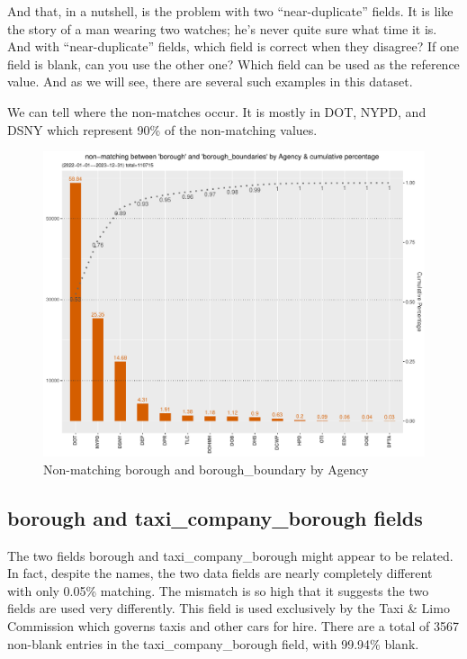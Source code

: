 \documentclass[12pt, titlepage]{article}
\begin{document}
{And that, in a nutshell, is the problem with two ``near-duplicate'' 
fields. It is like the  story of a man wearing two watches; he's never 
quite sure what time it is. And with ``near-duplicate'' fields, which 
field is correct when they disagree? If one field is blank, can you 
use the other one? Which field can be used as the reference value. And 
as we will see, there are several such examples in this dataset.

We can tell where the non-matches occur. It is mostly in DOT, NYPD, 
and DSNY which represent 90\% of the non-matching values.

	\begin{figure}[tbp]
		\centering
		\includegraphics[width = \textwidth]{non_matching_borough_boundaries_chart.pdf}
		\caption{Non-matching borough and borough\_boundary by Agency}
		\label{fig:borough-boundaries}
	\end{figure}	
	
\subsection{borough and taxi\_company\_borough fields}
The two fields borough and taxi\_company\_borough might appear to be 
related. In fact, despite the names, the two data fields are nearly 
completely different with only 0.05\% matching. The mismatch is so 
high that it suggests the two fields are used very differently. This field 
is used exclusively by the Taxi \& Limo Commission which governs 
taxis and other cars for hire. There are a total of 3567 non-blank 
entries in the taxi\_company\_borough field, with 99.94\% blank.

}
\end{document}

